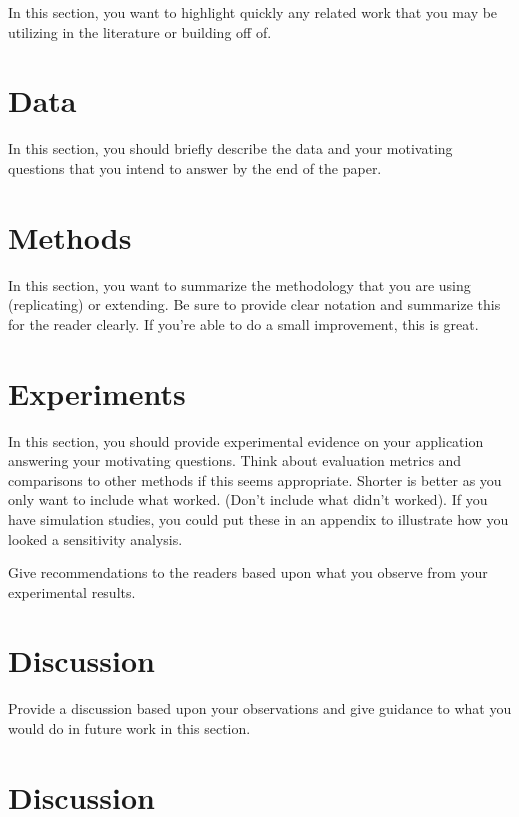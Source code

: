 \documentclass[12pt]{article}\usepackage[]{graphicx}\usepackage[]{color}
\begin{document}
In this section, you want to highlight quickly any related work that you may be utilizing in the literature or building off of. 

\section{Data}
\label{sec:data}

In this section, you should briefly describe the data and your motivating questions that you intend to answer by the end of the paper. 

\section{Methods}

In this section, you want to summarize the methodology that you are using (replicating) or extending. Be sure to provide clear notation and summarize this for the reader clearly. If you're able to do a small improvement, this is great. 

\section{Experiments}

In this section, you should provide experimental evidence on your application answering your motivating questions. Think about evaluation metrics and comparisons to other methods if this seems appropriate. Shorter is better as you only want to include what worked. (Don't include what didn't worked). 
If you have simulation studies, you could put these in an appendix to illustrate how you looked a sensitivity analysis.

Give recommendations to the readers based upon what you observe from your experimental results. 

\section{Discussion}

Provide a discussion based upon your observations and give guidance to what you would do in future work in this section. 

\clearpage
\newpage
\section{Discussion}

\clearpage
\newpage



\clearpage
\newpage
\end{document}
